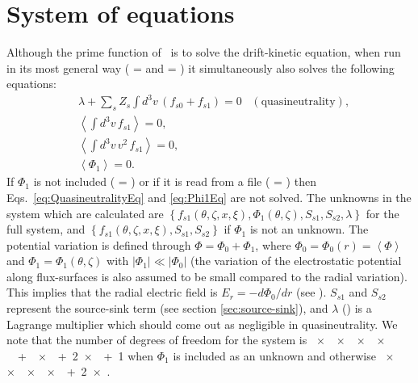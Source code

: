 \section{System of equations}
Although the prime function of \sfincs~is to solve the drift-kinetic equation, when run in its most general way ( = \true and  = \false) it simultaneously also solves the following equations:
\begin{align}
	& \lambda + \sum_s Z_s \int d^3 v \, \left(f_{s 0} + f_{s 1} \right) = 0 \;\;\; (\mathrm{quasineutrality}), \label{eq:QuasineutralityEq}\\ %
	& %
	\left\langle \int d^3 v \, f_{s 1} \right\rangle = 0, 
	\label{eq:DensityEq}\\ %
	& %
	\left\langle \int d^3 v \, v^2 \, f_{s 1} \right\rangle = 0,
	\label{eq:EnergyEq}\\
	& \left\langle \Phi_1 \right\rangle = 0. \label{eq:Phi1Eq} 
\end{align}
If $\Phi_1$ is not included ( = \false) or if it is read from a file ( = \false) then Eqs.~\eqref{eq:QuasineutralityEq} and \eqref{eq:Phi1Eq} are not solved. 
The unknowns in the system which are calculated are $\left\{f_{s1} \left(\theta, \zeta, x, \xi\right), \Phi_1 \left(\theta, \zeta\right), S_{s 1}, S_{s 2}, \lambda\right\}$ for the full system, and $\left\{f_{s1} \left(\theta, \zeta, x, \xi\right), S_{s 1}, S_{s 2}\right\}$ if $\Phi_1$ is not an unknown. 
The potential variation is defined through $\Phi = \Phi_0 + \Phi_1$, where $\Phi_0 = \Phi_0\left(r\right) = \left\langle \Phi \right\rangle$ and $\Phi_1 = \Phi_1\left(\theta, \zeta\right)$ with $\left|\Phi_1\right| \ll \left|\Phi_0\right|$ (the variation of the electrostatic potential along flux-surfaces is also assumed to be small compared to the radial variation). 
This implies that the radial electric field is $E_r = - d\Phi_0/dr$ (see ).
$S_{s 1}$ and $S_{s 2}$ represent the source-sink term (see section \ref{sec:source-sink}), and $\lambda$ () is a Lagrange multiplier which should come out as negligible in quasineutrality. 
We note that the number of degrees of freedom for the system is\newline 
\Ntheta~$\times$~\Nzeta~$\times$~\Nx~$\times$~\Nxi~$\times$~~+~\Ntheta~$\times$~\Nzeta~+~2~$\times$~~+~1\newline 
when $\Phi_1$ is included as an unknown and otherwise\newline
\Ntheta~$\times$~\Nzeta~$\times$~\Nx~$\times$~\Nxi~$\times$~~+~2~$\times$~. 

